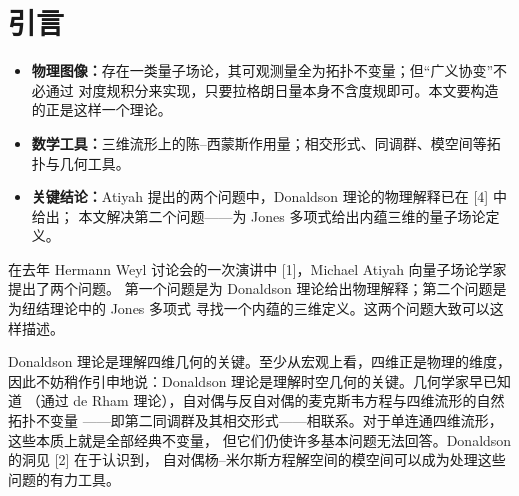 \documentclass[11pt,a4paper]{article}
\newenvironment{keypoints}{%
    \par\medskip
    \begin{tcolorbox}[enhanced, breakable,
        colback=blue!4!white, colframe=blue!40!black,
        boxrule=0.5pt, arc=2pt, left=6pt, right=6pt, top=4pt, bottom=4pt,
        title={\small\textbf{本节重点}\quad{\footnotesize（译者所加，非原文内容）}},
        fonttitle=\bfseries, coltitle=black, colbacktitle=blue!10!white,
        toptitle=1pt, bottomtitle=1pt]
    \begin{itemize}[leftmargin=1.4em, itemsep=2pt, topsep=2pt, parsep=0pt]
}{%
    \end{itemize}
    \end{tcolorbox}
    \par\medskip
}
\begin{document}
\tableofcontents
\newpage


\section*{引言}

\begin{keypoints}
    \item \textbf{物理图像：}存在一类量子场论，其可观测量全为拓扑不变量；但“广义协变”不必通过
          对度规积分来实现，只要拉格朗日量本身不含度规即可。本文要构造的正是这样一个理论。
    \item \textbf{数学工具：}三维流形上的陈–西蒙斯作用量；相交形式、同调群、模空间等拓扑与几何工具。
    \item \textbf{关键结论：}Atiyah 提出的两个问题中，Donaldson 理论的物理解释已在 [4] 中给出；
          本文解决第二个问题——为 Jones 多项式给出内蕴三维的量子场论定义。
\end{keypoints}

在去年 Hermann Weyl 讨论会的一次演讲中 [1]，Michael Atiyah 向量子场论学家提出了两个问题。
第一个问题是为 Donaldson 理论给出物理解释；第二个问题是为纽结理论中的 Jones 多项式
寻找一个内蕴的三维定义。这两个问题大致可以这样描述。

Donaldson 理论是理解四维几何的关键。至少从宏观上看，四维正是物理的维度，
因此不妨稍作引申地说：Donaldson 理论是理解时空几何的关键。几何学家早已知道
（通过 de Rham 理论），自对偶与反自对偶的麦克斯韦方程与四维流形的自然拓扑不变量
——即第二同调群及其相交形式——相联系。对于单连通四维流形，这些本质上就是全部经典不变量，
但它们仍使许多基本问题无法回答。Donaldson 的洞见 [2] 在于认识到，
自对偶杨–米尔斯方程解空间的模空间可以成为处理这些问题的有力工具。

%
\end{document}
